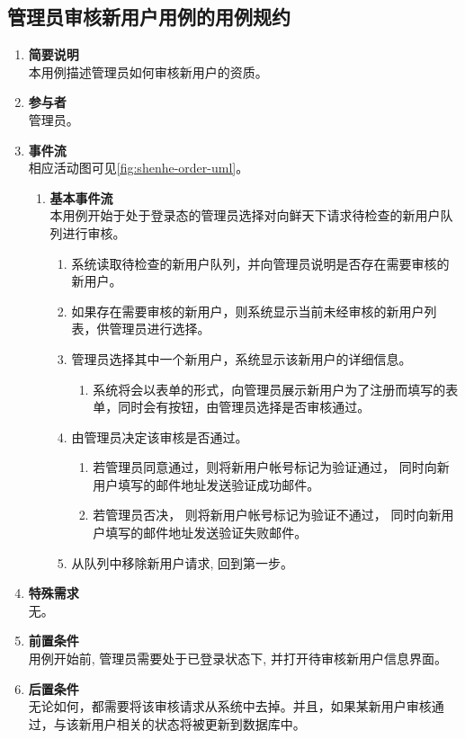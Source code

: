 \subsection{管理员审核新用户用例的用例规约}


\begin{enumerate}
	\item \textbf{简要说明}  \\ 本用例描述管理员如何审核新用户的资质。
	\item \textbf{参与者} \\ 管理员。
	\item \textbf{事件流} \\ 相应活动图可见\autoref{fig:shenhe-order-uml}。
	\begin{enumerate} 
        \item \textbf{基本事件流} \\ 本用例开始于处于登录态的管理员选择对向鲜天下请求待检查的新用户队列进行审核。
        \begin{enumerate}
            \item 系统读取待检查的新用户队列，并向管理员说明是否存在需要审核的新用户。
            \item 如果存在需要审核的新用户，则系统显示当前未经审核的新用户列表，供管理员进行选择。
            \item 管理员选择其中一个新用户，系统显示该新用户的详细信息。
            \begin{enumerate}
                \item 系统将会以表单的形式，向管理员展示新用户为了注册而填写的表单，同时会有按钮，由管理员选择是否审核通过。
            \end{enumerate}
            \item 由管理员决定该审核是否通过。
            \begin{enumerate}
                \item 若管理员同意通过，则将新用户帐号标记为验证通过， 同时向新用户填写的邮件地址发送验证成功邮件。
                \item 若管理员否决， 则将新用户帐号标记为验证不通过， 同时向新用户填写的邮件地址发送验证失败邮件。
            \end{enumerate}
            \item 从队列中移除新用户请求, 回到第一步。
        \end{enumerate}
    \end{enumerate}
    \item \textbf{特殊需求} \\ 无。
    \item \textbf{前置条件} \\ 用例开始前, 管理员需要处于已登录状态下, 并打开待审核新用户信息界面。
    \item \textbf{后置条件} \\ 无论如何，都需要将该审核请求从系统中去掉。并且，如果某新用户审核通过，与该新用户相关的状态将被更新到数据库中。
\end{enumerate}



